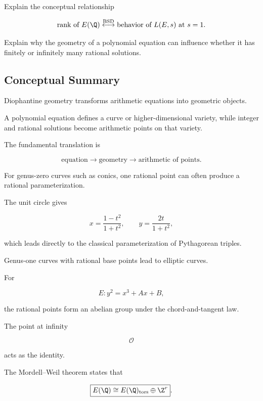 \begin{exercise}[3]
Explain the conceptual relationship

\[
\text{rank of }E(\Q)
\stackrel{\mathrm{BSD}}{\longleftrightarrow}
\text{behavior of }L(E,s)\text{ at }s=1.
\]
\end{exercise}

\begin{exercise}[3]
Explain why the geometry of a polynomial equation can influence whether it
has finitely or infinitely many rational solutions.
\end{exercise}

\subsection{Conceptual Summary}
\label{subsec:diophantine-geometry-summary}

Diophantine geometry transforms arithmetic equations into geometric objects.

A polynomial equation defines a curve or higher-dimensional variety, while
integer and rational solutions become arithmetic points on that variety.

The fundamental translation is

\[
\boxed{
\text{equation}
\longrightarrow
\text{geometry}
\longrightarrow
\text{arithmetic of points}.
}
\]

For genus-zero curves such as conics, one rational point can often produce a
rational parameterization.

The unit circle gives

\[
x=\frac{1-t^2}{1+t^2},
\qquad
y=\frac{2t}{1+t^2},
\]

which leads directly to the classical parameterization of Pythagorean
triples.

Genus-one curves with rational base points lead to elliptic curves.

For

\[ E:y^2=x^3+Ax+B, \]

the rational points form an abelian group under the chord-and-tangent law.

The point at infinity

\[ \mathcal O \]

acts as the identity.

The Mordell--Weil theorem states that

\[ \boxed{E(\Q)\cong E(\Q)_{\mathrm{tors}}\oplus\Z^r}. \]

